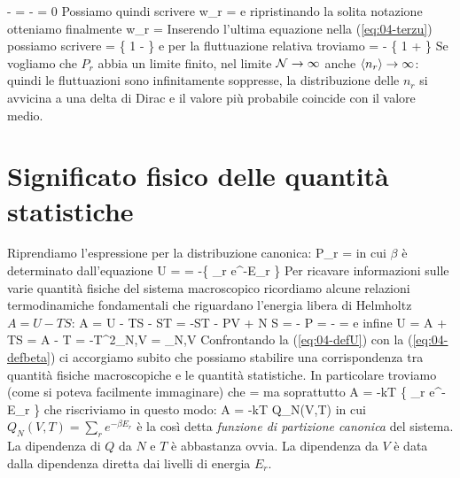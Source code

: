 \be
{} -  = 
 -  = 0
\ee
Possiamo quindi scrivere
\be
w_r =  
\ee
e ripristinando la solita notazione otteniamo finalmente
\be
w_r =  
\ee
Inserendo l'ultima equazione nella (\ref{eq:04-terzu}) possiamo scrivere
\be
{} = 
\left\{
1 -  
\right\}
\ee
e per la fluttuazione relativa troviamo
\be
{} =  - 
\left\{
1 + 
\right\}
\ee
Se vogliamo che $P_r$ abbia un limite finito, nel limite ${\mathcal N}\to\infty$ anche $\langle n_r\rangle\to\infty$: quindi le fluttuazioni sono infinitamente soppresse, la distribuzione delle $n_r$ si avvicina a una delta di Dirac e il valore più probabile coincide con il valore medio.

\section{Significato fisico delle quantità statistiche}
\label{sec:04-significato}

Riprendiamo l'espressione per la distribuzione canonica:
\be
\label{eq:04-distcan}
P_r \equiv {} = 
\ee
in cui $\beta$ è determinato dall'equazione
\be
\label{eq:04-defbeta}
U =  = -\dpar{}{\beta}\ln\left\{ \sum_r e^{-\beta E_r} \right\}
\ee
Per ricavare informazioni sulle varie quantità fisiche del sistema macroscopico ricordiamo alcune relazioni termodinamiche fondamentali che riguardano l'energia libera di Helmholtz $A = U - TS$:
\be
\label{eq:04-dA}
\de A = \de U - T\de S - S\de T = -S\de T - P\de V + \mu\de N
\ee
\be
\label{eq:04-maxdA}
S   = - \quad
P   = - \quad
\mu =  
\ee
e infine
\be
\label{eq:04-defU}
U = A + TS = A - T = -T^2_{N,V}
= _{N,V}
\ee
Confrontando la (\ref{eq:04-defU}) con la (\ref{eq:04-defbeta}) ci accorgiamo subito che possiamo stabilire una corrispondenza tra quantità fisiche macroscopiche e le quantità statistiche. In particolare troviamo (come si poteva facilmente immaginare) che
\be
\beta = 
\ee
ma soprattutto
\be
A = -kT \ln\left\{ \sum_r e^{-\beta E_r} \right\}
\ee
che riscriviamo in questo modo:
\be
\label{eq:04-introQ}
A = -kT \ln Q_N(V,T)
\ee
in cui $Q_N(V,T) = \sum_r e^{-\beta E_r}$ è la così detta {\em funzione di partizione canonica} del sistema. La dipendenza di $Q$ da $N$ e $T$ è abbastanza ovvia. La dipendenza da $V$ è data dalla dipendenza diretta dai livelli di energia $E_r$.

